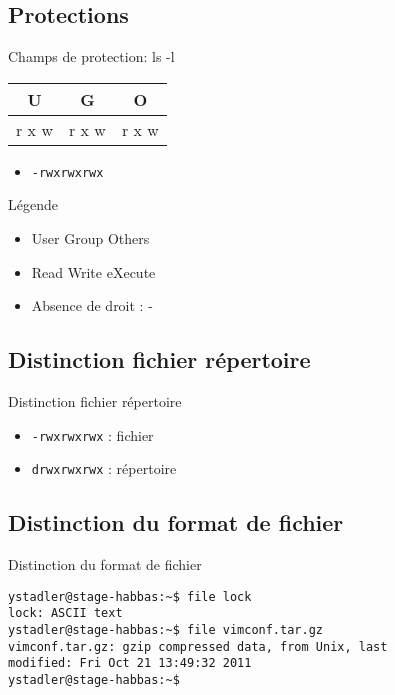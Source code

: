 \def\subsectitle{Protections}
\subsection{\subsectitle}
\begin{frame}{\sectitle}
\begin{block}{Champs de protection: ls -l}
    \begin{center}
        \begin{tabular}{|c|c|c|}
        \hline
        U & G & O\\
        \hline
        r x w & r x w & r x w \\
        \hline
        \end{tabular}
    \end{center}

    \begin{itemize}
        \item \texttt{-rwxrwxrwx}
    \end{itemize}
\end{block}

\begin{block}{Légende}
\begin{itemize}
\item  User Group Others
\item  Read Write eXecute
\item  Absence de droit : -
\end{itemize}
\end{block}

\end{frame}

\begin{frame}[containsverbatim]{\sectitle}
\def\subsectitle{Distinction fichier répertoire}
\subsection{\subsectitle}
\begin{block}{\subsectitle}
\begin{itemize}
    \item \texttt{-rwxrwxrwx} : fichier
    \item \texttt{drwxrwxrwx} : répertoire
\end{itemize}
\end{block}

\def\subsectitle{Distinction du format de fichier}
\subsection{\subsectitle}
\begin{block}{\subsectitle}
\begin{verbatim}
ystadler@stage-habbas:~$ file lock
lock: ASCII text
ystadler@stage-habbas:~$ file vimconf.tar.gz
vimconf.tar.gz: gzip compressed data, from Unix, last 
modified: Fri Oct 21 13:49:32 2011
ystadler@stage-habbas:~$
\end{verbatim}
\end{block} 

\end{frame}

